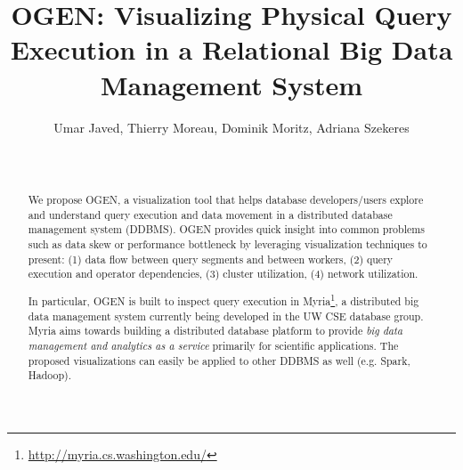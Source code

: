 \documentclass{chi2009}
\newcommand*{\system}{OGEN\xspace}
\newcommand*{\papertitle}{\system: Visualizing Physical Query Execution in a Relational Big Data Management System}
\begin{document}
\setlength{\paperheight}{11in}
\setlength{\paperwidth}{8.5in}
\setlength{\pdfpageheight}{\paperheight}
\setlength{\pdfpagewidth}{\paperwidth}

\toappear{}

\title{\papertitle}
\author{\alignauthor Umar Javed, Thierry Moreau, Dominik Moritz, Adriana Szekeres \\
 \\  \\
}

\maketitle

\begin{abstract}

We propose \system, a visualization tool that helps database developers/users
explore and understand query execution and data movement in a distributed
database management system (DDBMS). \system provides quick insight into common
problems such as data skew or performance bottleneck by leveraging
visualization techniques to present: (1) data flow between query segments and
between workers, (2) query execution and operator dependencies, (3) cluster
utilization, (4) network utilization.

In particular, \system is built to inspect query execution in
Myria\footnote{\url{http://myria.cs.washington.edu/}}, a distributed big data
management system currently being developed in the UW CSE database group. Myria
aims towards building a distributed database platform to provide \emph{big data
management and analytics as a service} primarily for scientific applications.
The proposed visualizations can easily be applied to other DDBMS as well (e.g.
Spark, Hadoop).

\end{abstract}


\end{document}
